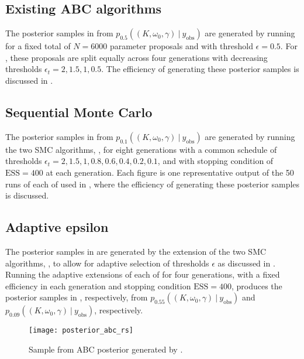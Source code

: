 \documentclass[12pt, onecolumn]{article}
\newcommand{\obs}[1]{#1_{\mathrm{obs}}}
\begin{document}
\subsection{Existing ABC algorithms}
The posterior samples in  from $p_{0.5}((K, \omega_0, \gamma)~|~\obs y)$ are generated by running  for a fixed total of $N=6000$ parameter proposals and with threshold $\epsilon = 0.5$. 
For , these proposals are split equally across four generations with decreasing thresholds $\epsilon_t = 2, 1.5, 1, 0.5$. 
The efficiency of generating these posterior samples is discussed in .

\subsection{Sequential Monte Carlo}
The posterior samples in  from $p_{0.1}((K, \omega_0, \gamma)~|~\obs y)$ are generated by running the two SMC algorithms, , for eight generations with a common schedule of thresholds $\epsilon_t = 2, 1.5, 1, 0.8, 0.6, 0.4, 0.2, 0.1$, and with stopping condition of $\mathrm{ESS}=400$ at each generation.
Each figure is one representative output of the 50 runs of each of  used in , where the efficiency of generating these posterior samples is discussed.

\subsection{Adaptive epsilon}
The posterior samples in  are generated by the extension of the two SMC algorithms, , to allow for adaptive selection of thresholds $\epsilon$ as discussed in .
Running the adaptive extensions of each of  for four generations, with a fixed efficiency in each generation and stopping condition $\mathrm{ESS}=400$, produces the posterior samples in , respectively, from $p_{0.55}((K, \omega_0, \gamma)~|~\obs y)$ and $p_{0.09}((K, \omega_0, \gamma)~|~\obs y)$, respectively.

\begin{figure*}[p]
\centering
\texttt{[image: posterior\_abc\_rs]}
\caption{
Sample from ABC posterior generated by .
}
\label{post:ABC:Rejection}
\end{figure*}
\end{document}
